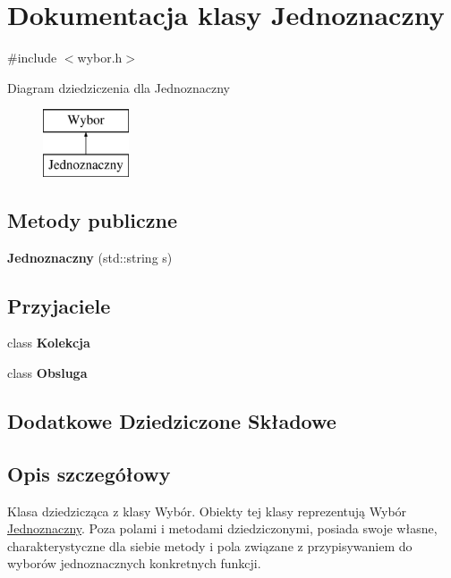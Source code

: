\hypertarget{classJednoznaczny}{\section{Dokumentacja klasy Jednoznaczny}
\label{classJednoznaczny}
}


{\ttfamily \#include $<$wybor.\-h$>$}

Diagram dziedziczenia dla Jednoznaczny\begin{figure}[H]
\begin{center}
\leavevmode
\includegraphics[height=2.000000cm]{classJednoznaczny}
\end{center}
\end{figure}
\subsection*{Metody publiczne}
\begin{DoxyCompactItemize}
\item 
\hypertarget{classJednoznaczny_a132863c0ea5e199f3e03b77eaae29b6f}{{\bfseries Jednoznaczny} (std\-::string s)}\label{classJednoznaczny_a132863c0ea5e199f3e03b77eaae29b6f}

\end{DoxyCompactItemize}
\subsection*{Przyjaciele}
\begin{DoxyCompactItemize}
\item 
\hypertarget{classJednoznaczny_acbfbc86fbec88d567dc6313b7419d6fa}{class {\bfseries Kolekcja}}\label{classJednoznaczny_acbfbc86fbec88d567dc6313b7419d6fa}

\item 
\hypertarget{classJednoznaczny_aaba4100c363553c323b55344e224e15d}{class {\bfseries Obsluga}}\label{classJednoznaczny_aaba4100c363553c323b55344e224e15d}

\end{DoxyCompactItemize}
\subsection*{Dodatkowe Dziedziczone Składowe}


\subsection{Opis szczegółowy}
Klasa dziedzicząca z klasy Wybór. Obiekty tej klasy reprezentują Wybór \hyperlink{classJednoznaczny}{Jednoznaczny}. Poza polami i metodami dziedziczonymi, posiada swoje własne, charakterystyczne dla siebie metody i pola związane z przypisywaniem do wyborów jednoznacznych konkretnych funkcji. 